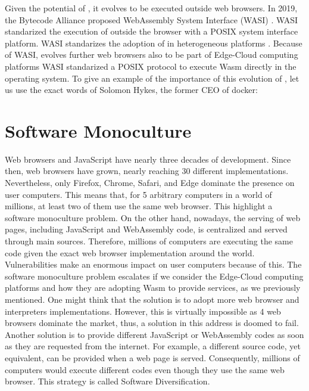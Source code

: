 Given the potential of \wasm, it evolves to be executed outside web browsers.
In 2019, the Bytecode Alliance \cite{bytecodealliance} proposed WebAssembly System Interface (WASI) \cite{WASI}. 
WASI standarized the execution of \wasm outside the browser with a POSIX system interface platform.
WASI standarizes the adoption of \wasm in heterogeneous platforms \cite{bryant2020webassembly}. 
Because of WASI, \wasm evolves further web browsers also to be part of Edge-Cloud computing platforms \cite{9640153, wen2020wasmachine}
WASI standarized a POSIX protocol to execute Wasm directly in the operating system. 
To give an example of the importance of this evolution of \wasm, let us use the exact words of Solomon Hykes, the former CEO of docker: 

\vspace{0.5cm}

\begin{minipage}{0.8\linewidth}
\end{minipage}

\section{Software Monoculture}

Web browsers and JavaScript have nearly three decades of development.
Since then, web browsers have grown, nearly reaching 30 different implementations. 
Nevertheless, only Firefox, Chrome, Safari, and Edge dominate the presence on user computers.
This means that, for 5 arbitrary computers in a world of millions, at least two of them use the same web browser.
This highlight a software monoculture problem.
On the other hand, nowadays, the serving of web pages, including JavaScript and WebAssembly code, is centralized and served through main sources.
Therefore, millions of computers are executing the same code given the exact web browser implementation around the world.
Vulnerabilities make an enormous impact on user computers because of this.
The software monoculture problem escalates if we consider the Edge-Cloud computing platforms and how they are adopting Wasm to provide services, as we previously mentioned.
One might think that the solution is to adopt more web browser and interpreters implementations. 
However, this is virtually impossible as 4 web browsers dominate the market, thus, a solution in this address is doomed to fail. 
Another solution is to provide different JavaScript or WebAssembly codes as soon as they are requested from the internet. 
For example, a different source code, yet equivalent, can be provided when a web page is served. 
Consequently, millions of computers would execute different codes even though they use the same web browser.
This strategy is called Software Diversification.

